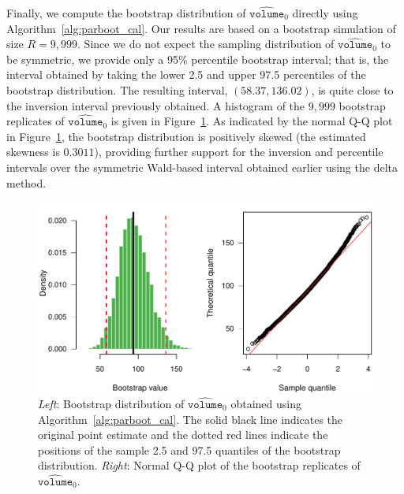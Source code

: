 \documentclass[cmfont,usenames,dvipsnames,leqno]{afit-etd}\usepackage[]{graphicx}\usepackage[]{color}
\makeatletter
\def\maxwidth{ %
  \ifdim\Gin@nat@width>\linewidth
    \linewidth
  \else
    \Gin@nat@width
  \fi
}
\newenvironment{knitrout}{}{} %
\renewenvironment{knitrout}{\begin{singlespace}}{\end{singlespace}}
\newcommand{\wh}[1]{\ensuremath{\widehat{#1}}}
\makeatother
\begin{document}
Finally, we compute the bootstrap distribution of $\wh{\texttt{volume}}_0$ directly using Algorithm~\ref{alg:parboot_cal}. Our results are based on a bootstrap simulation of size $R = 9,999$. Since we do not expect the sampling distribution of $\wh{\texttt{volume}}_0$ to be symmetric, we provide only a 95\% percentile bootstrap interval; that is, the interval obtained by taking the lower 2.5 and upper 97.5 percentiles of the bootstrap distribution. The resulting interval, $(58.37, 136.02)$, is quite close to the inversion interval previously obtained. A histogram of the $9,999$ bootstrap replicates of $\wh{\texttt{volume}}_0$ is given in Figure~\ref{fig:bladder-parboot-hist2}. As indicated by the normal Q-Q plot in Figure~\ref{fig:bladder-parboot-hist2}, the bootstrap distribution is positively skewed (the estimated skewness is $0.3011$), providing further support for the inversion and percentile intervals over the symmetric Wald-based interval obtained earlier using the delta method. 

\begin{knitrout}
\color{fgcolor}\begin{figure}[H]

\includegraphics[width=\maxwidth]{figure/bladder-parboot-hist2} \caption[Bootstrap distribution of $\wh{\texttt{volume}}_0$ obtained using Algorithm~\ref{alg:parboot_cal}]{\textit{Left}: Bootstrap distribution of $\wh{\texttt{volume}}_0$ obtained using Algorithm~\ref{alg:parboot_cal}. The solid black line indicates the original point estimate and the dotted red lines indicate the positions of the sample 2.5 and 97.5 quantiles of the bootstrap distribution. \textit{Right}: Normal Q-Q plot of the bootstrap replicates of $\wh{\texttt{volume}}_0$.\label{fig:bladder-parboot-hist2}}
\end{figure}


\end{knitrout}
\end{document}

